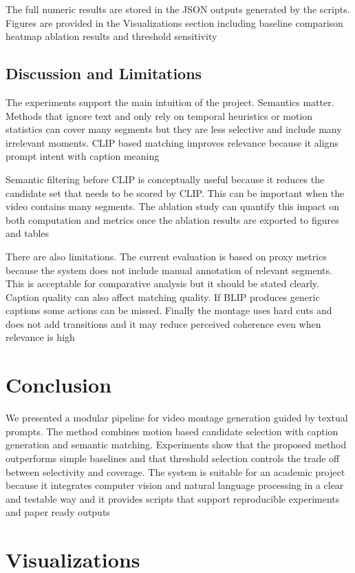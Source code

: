 \documentclass[conference,compsoc]{IEEEtran}
\begin{document}
The full numeric results are stored in the JSON outputs generated by the scripts. Figures are provided in the Visualizations section including baseline comparison heatmap ablation results and threshold sensitivity

\subsection{Discussion and Limitations}
The experiments support the main intuition of the project. Semantics matter. Methods that ignore text and only rely on temporal heuristics or motion statistics can cover many segments but they are less selective and include many irrelevant moments. CLIP based matching improves relevance because it aligns prompt intent with caption meaning

Semantic filtering before CLIP is conceptually useful because it reduces the candidate set that needs to be scored by CLIP. This can be important when the video contains many segments. The ablation study can quantify this impact on both computation and metrics once the ablation results are exported to figures and tables

There are also limitations. The current evaluation is based on proxy metrics because the system does not include manual annotation of relevant segments. This is acceptable for comparative analysis but it should be stated clearly. Caption quality can also affect matching quality. If BLIP produces generic captions some actions can be missed. Finally the montage uses hard cuts and does not add transitions and it may reduce perceived coherence even when relevance is high

\section{Conclusion}
We presented a modular pipeline for video montage generation guided by textual prompts. The method combines motion based candidate selection with caption generation and semantic matching. Experiments show that the proposed method outperforms simple baselines and that threshold selection controls the trade off between selectivity and coverage. The system is suitable for an academic project because it integrates computer vision and natural language processing in a clear and testable way and it provides scripts that support reproducible experiments and paper ready outputs

\section{Visualizations}
\end{document}
